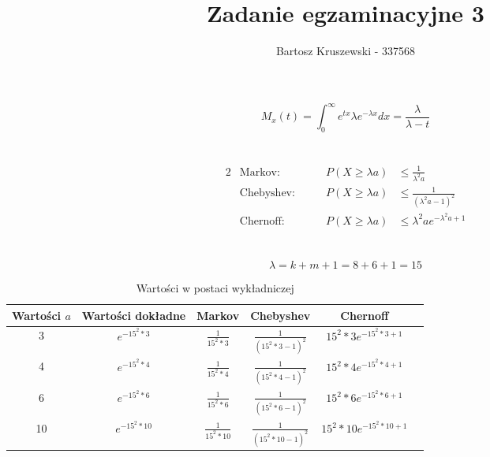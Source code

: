 \documentclass{article}
\title{Zadanie egzaminacyjne 3}
\author{Bartosz Kruszewski - 337568}
\begin{document}
\maketitle

\section{}
\begin{equation*}
M_x(t) = \int_{0}^{\infty} e^{tx} \lambda e^{-\lambda x} dx = \frac{\lambda}{\lambda - t}
\end{equation*}

\section{}
\begin{alignat*}{2}
&\text{Markov:} &\qquad P(X \ge \lambda a) &\le \frac{1}{\lambda^{2} a} \\
&\text{Chebyshev:} &\qquad P(X \ge \lambda a) &\le \frac{1}{(\lambda^{2} a - 1)^2} \\
&\text{Chernoff:} &\qquad P(X \ge \lambda a) &\le \lambda^{2} a e^{-\lambda^{2} a + 1}
\end{alignat*}

\section{}

\begin{equation*}
    \lambda = k + m + 1 = 8 + 6 + 1 = 15
\end{equation*}

\begin{table*}[htbp]
    \centering
    \caption{Wartości w postaci wykładniczej}
    \begin{tabular}{cccccc}
        \toprule
        Wartości $a$ & Wartości dokładne & Markov & Chebyshev & Chernoff \\
        \midrule
        3 & $e^{-15^{2} * 3}$ & $\frac{1}{15^2 * 3}$ & $\frac{1}{(15^2 * 3 - 1)^2}$ & $15^{2} * 3 e^{-15^{2} * 3 + 1}$ \\
        4 & $e^{-15^{2} * 4}$ & $\frac{1}{15^2 * 4}$ & $\frac{1}{(15^2 * 4 - 1)^2}$ & $15^{2} * 4 e^{-15^{2} * 4 + 1}$ \\
        6 & $e^{-15^{2} * 6}$ & $\frac{1}{15^2 * 6}$ & $\frac{1}{(15^2 * 6 - 1)^2}$ & $15^{2} * 6 e^{-15^{2} * 6 + 1}$ \\
        10 & $e^{-15^{2} * 10}$ & $\frac{1}{15^2 * 10}$ & $\frac{1}{(15^2 * 10 - 1)^2}$ & $15^{2} * 10 e^{-15^{2} * 10 + 1}$ \\
        \bottomrule
    \end{tabular}
\end{table*}
\end{document}
